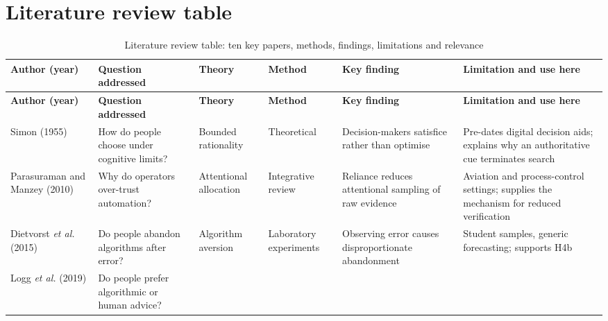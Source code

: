 \documentclass[11pt,a4paper]{article}
\numberwithin{figure}{section}
\numberwithin{table}{section}
\begin{document}
\newpage
\appendix
\renewcommand{\thesection}{Appendix \Alph{section}}
\titleformat{\section}{\normalfont\large\bfseries}{\thesection.}{0.6em}{}
\setcounter{section}{0}

\section{Literature review table}

\begin{longtable}{@{}p{2.1cm} p{2.4cm} p{2.4cm} p{2.4cm} p{2.5cm} p{2.6cm}@{}}
\caption{Literature review table: ten key papers, methods, findings, limitations and relevance}\\
\toprule
\footnotesize\textbf{Author (year)} & \footnotesize\textbf{Question addressed} &
\footnotesize\textbf{Theory} & \footnotesize\textbf{Method} & \footnotesize\textbf{Key finding} &
\footnotesize\textbf{Limitation and use here} \\
\midrule
\endfirsthead
\toprule
\footnotesize\textbf{Author (year)} & \footnotesize\textbf{Question addressed} &
\footnotesize\textbf{Theory} & \footnotesize\textbf{Method} & \footnotesize\textbf{Key finding} &
\footnotesize\textbf{Limitation and use here} \\
\midrule
\endhead
\bottomrule
\endfoot
\footnotesize Simon (1955) & How do people choose under cognitive limits? & Bounded rationality &
Theoretical & Decision-makers satisfice rather than optimise & Pre-dates digital decision aids;
explains why an authoritative cue terminates search \\
\addlinespace
\footnotesize Parasuraman and Manzey (2010) & Why do operators over-trust automation? & Attentional
allocation & Integrative review & Reliance reduces attentional sampling of raw evidence &
Aviation and process-control settings; supplies the mechanism for reduced verification \\
\addlinespace
\footnotesize Dietvorst \emph{et al.} (2015) & Do people abandon algorithms after error? & Algorithm
aversion & Laboratory experiments & Observing error causes disproportionate abandonment & Student
samples, generic forecasting; supports H4b \\
\addlinespace
\footnotesize Logg \emph{et al.} (2019) & Do people prefer algorithmic or human advice? &

\end{longtable}
\end{document}
